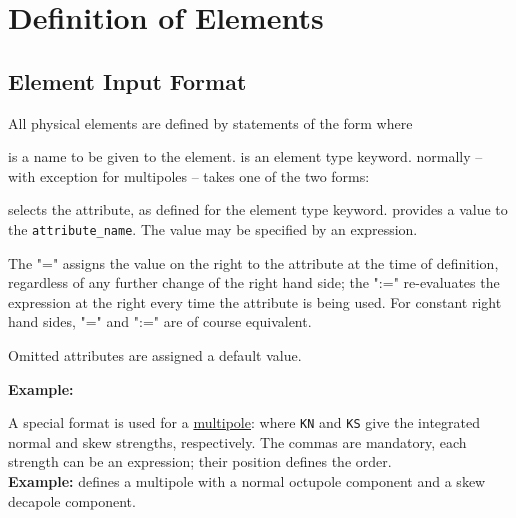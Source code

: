
\chapter{Definition of Elements}
\label{chap:element-definition}

\section{Element Input Format}
\label{sec:element-input}

All physical elements are defined by statements of the form 
where 
\begin{madlist}
   is a name to be given to the element.
   is an element type keyword.  
   normally -- with exception for multipoles -- takes
  one of the two forms: 
    \begin{madlist}
       selects the attribute,
      as defined for the element type keyword.   
       provides a value to the
      \texttt{attribute\_name}. The value may be specified by an
      expression. 
    \end{madlist}
    The "=" assigns the value on the right to
    the attribute at the time of definition, regardless of any
    further change of the right hand side; the ":=" re-evaluates
    the expression at the right every time the attribute is being
    used. For constant right hand sides, "=" and ":=" are of
    course equivalent.  
\end{madlist}

Omitted attributes are assigned a default value.

\textbf{Example:} 

A special format is used for a
\hyperref[sec:multipole]{multipole}:  
where \texttt{KN} and \texttt{KS} give the integrated normal and skew strengths,
respectively. The commas are mandatory, each strength can be an
expression; their position defines the order.\\
\textbf{Example:}  
defines a multipole with a normal octupole component and a skew decapole
component.  

